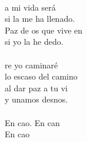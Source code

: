 \begin{cancion}
\jump\\
	a mi vida será\\
	si la  me ha llenado. \\
	Paz de os que vive en  \\
	si yo la he dedo.\\
\jump\\
	re yo caminaré \\
	lo escaso del camino\\
	al dar  paz a tu vi \\
	y unamos desnos.\\
\jump\\
	En cao. En can\\
	En cao\\
\end{cancion}%
